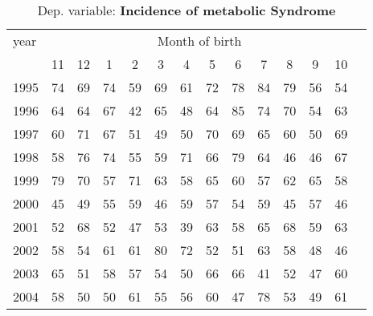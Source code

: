  \begin{table}[H] \begin{threeparttable} \centering \caption{Dep. variable: \textbf{Incidence of metabolic Syndrome}} {\def\sym#1{\ifmmode^{#1}\else\(^{#1}\)\fi} \begin{tabular}{l*{13}{c}} \toprule year & \multicolumn{12}{c}{Month of birth} \\ \cmidrule(lr){2-13} 
            &          11&          12&           1&           2&           3&           4&           5&           6&           7&           8&           9&          10\\
1995        &          74&          69&          74&          59&          69&          61&          72&          78&          84&          79&          56&          54\\
1996        &          64&          64&          67&          42&          65&          48&          64&          85&          74&          70&          54&          63\\
1997        &          60&          71&          67&          51&          49&          50&          70&          69&          65&          60&          50&          69\\
1998        &          58&          76&          74&          55&          59&          71&          66&          79&          64&          46&          46&          67\\
1999        &          79&          70&          57&          71&          63&          58&          65&          60&          57&          62&          65&          58\\
2000        &          45&          49&          55&          59&          46&          59&          57&          54&          59&          45&          57&          46\\
2001        &          52&          68&          52&          47&          53&          39&          63&          58&          65&          68&          59&          63\\
2002        &          58&          54&          61&          61&          80&          72&          52&          51&          63&          58&          48&          46\\
2003        &          65&          51&          58&          57&          54&          50&          66&          66&          41&          52&          47&          60\\
2004        &          58&          50&          50&          61&          55&          56&          60&          47&          78&          53&          49&          61\\

\end{tabular}}
\end{threeparttable}
\end{table}
